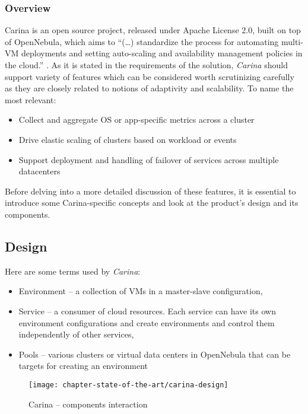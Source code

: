 \subsubsection{Overview}
Carina is an open source project, released under Apache License 2.0, built on top of OpenNebula, which aims to ``(\ldots) standardize the process for automating multi-VM deployments and setting auto-scaling and availability management policies in the cloud.'' \cite{CarinaBlog}.
As it is stated in the requirements of the solution, \emph{Carina} should support variety of features which can be considered worth scrutinizing carefully as they are closely related to notions of adaptivity and scalability. To name the most relevant: \cite{CarinaBlog}
\begin{itemize}
  \item Collect and aggregate OS or app-specific metrics across a cluster
  \item Drive elastic scaling of clusters based on workload or events
  \item Support deployment and handling of failover of services across multiple datacenters
\end{itemize}

Before delving into a more detailed discussion of these features, it is essential to introduce some Carina-specific concepts and look at the product's design and its components.

\subsection{Design}
Here are some terms used by \emph{Carina}:
\begin{itemize}
  \item Environment -- a collection of VMs in a master-slave configuration,
  \item Service -- a consumer of cloud resources. Each service can have its own environment configurations and create environments and control them independently of other services,
  \item Pools -- various clusters or virtual data centers in OpenNebula that can be targets for creating an environment
\end{itemize}

\begin{figure}[!ht]
  \begin{center}
    \texttt{[image: chapter-state-of-the-art/carina-design]}
  \end{center}
  \caption{Carina -- components interaction}
  \label{sota:carina-design}
\end{figure}


